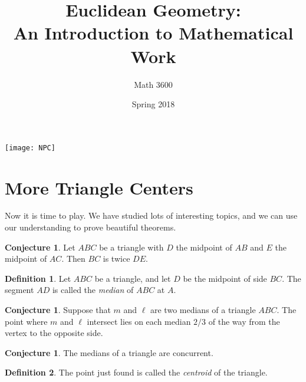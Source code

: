\documentclass{tufte-handout}
\title{Euclidean Geometry:\\An Introduction to Mathematical Work}
\author[]{Math 3600}
\date{Spring 2018}
\theoremstyle{definition}
\newtheorem{conjecture}[problem]{Conjecture}
\newtheorem*{definition}{Definition}
\newtheorem{challenge}[problem]{Challenge}
\begin{document}
\maketitle

\begin{marginfigure}
    \texttt{[image: NPC]}
\end{marginfigure}

\setcounter{section}{17}
\section{More Triangle Centers}

Now it is time to play. We have studied lots of interesting topics, and we can use our understanding to prove beautiful theorems.

\begin{conjecture} Let $ABC$ be a triangle with $D$ the midpoint of $AB$ and $E$ the midpoint of $AC$. Then $BC$ is twice $DE$.
\end{conjecture}

\begin{definition}\label{defn:median}
Let $ABC$ be a triangle, and let $D$ be the midpoint of side $BC$. The segment $AD$ is called the \emph{median} of $ABC$ at $A$.
\end{definition}

\begin{conjecture}\label{conj:location-median}
Suppose that $m$ and $\ell $ are two medians of a triangle $ABC$.  The point where $m$ and $\ell$ intersect lies on each median $2/3$ of the way from the vertex to the opposite side.
\end{conjecture}

\begin{conjecture}\label{conj:medians-concurrent}
The medians of a triangle are concurrent.
\end{conjecture}

\begin{definition}\label{defn:centroid}
The point just found is called the \emph{centroid} of the triangle.
\end{definition}

%
\end{document}
